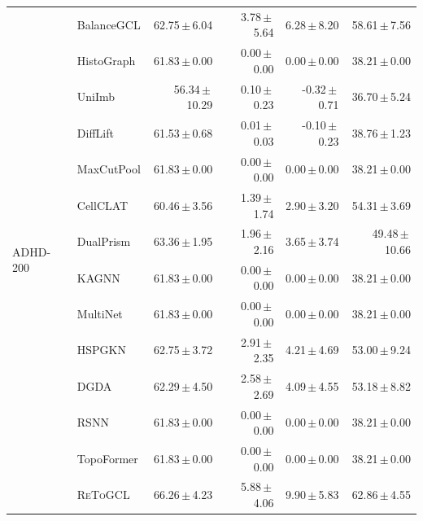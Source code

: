 \documentclass[10pt,twocolumn]{article}
\newcommand{\method}{\textsc{ReToGCL}}
\newcommand{\res}[2]{#1\,$\pm$\,#2}
\begin{document}
\begin{longtable}{@{}llrrrr@{}}
\multirow{14}{*}{ADHD-200}
& BalanceGCL & \res{62.75}{6.04} & \res{3.78}{5.64} & \res{6.28}{8.20} & \res{58.61}{7.56}\\
& HistoGraph & \res{61.83}{0.00} & \res{0.00}{0.00} & \res{0.00}{0.00} & \res{38.21}{0.00}\\
& UniImb & \res{56.34}{10.29} & \res{0.10}{0.23} & \res{-0.32}{0.71} & \res{36.70}{5.24}\\
& DiffLift & \res{61.53}{0.68} & \res{0.01}{0.03} & \res{-0.10}{0.23} & \res{38.76}{1.23}\\
& MaxCutPool & \res{61.83}{0.00} & \res{0.00}{0.00} & \res{0.00}{0.00} & \res{38.21}{0.00}\\
& CellCLAT & \res{60.46}{3.56} & \res{1.39}{1.74} & \res{2.90}{3.20} & \res{54.31}{3.69}\\
& DualPrism & \res{63.36}{1.95} & \res{1.96}{2.16} & \res{3.65}{3.74} & \res{49.48}{10.66}\\
& KAGNN & \res{61.83}{0.00} & \res{0.00}{0.00} & \res{0.00}{0.00} & \res{38.21}{0.00}\\
& MultiNet & \res{61.83}{0.00} & \res{0.00}{0.00} & \res{0.00}{0.00} & \res{38.21}{0.00}\\
& HSPGKN & \res{62.75}{3.72} & \res{2.91}{2.35} & \res{4.21}{4.69} & \res{53.00}{9.24}\\
& DGDA & \res{62.29}{4.50} & \res{2.58}{2.69} & \res{4.09}{4.55} & \res{53.18}{8.82}\\
& RSNN & \res{61.83}{0.00} & \res{0.00}{0.00} & \res{0.00}{0.00} & \res{38.21}{0.00}\\
& TopoFormer & \res{61.83}{0.00} & \res{0.00}{0.00} & \res{0.00}{0.00} & \res{38.21}{0.00}\\
\rowcolor{topologypurple!45}& \method{} & \res{66.26}{4.23} & \res{5.88}{4.06} & \res{9.90}{5.83} & \res{62.86}{4.55}\\
\midrule


\end{longtable}
\end{document}
